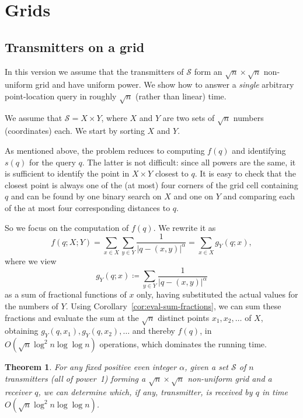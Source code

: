 \documentclass[11pt]{article}
\newtheorem{theorem}{Theorem}[section]
\theoremstyle{remark}
\def\S{\mathcal{S}}
\begin{document}
\iffalse
\section{Grids}
\subsection{Transmitters on a grid}
\label{sec:trans-grid}



In this version we assume that the transmitters of $\S$ form an $\sqrt{n} \times \sqrt{n}$
non-uniform grid and have uniform power.  We show how to answer a \emph{single}
arbitrary point-location query in roughly $\sqrt{n}$ (rather than linear)
time.

We assume that $\S=X \times Y$, where $X$ and $Y$ are two sets of $\sqrt{n}$
numbers (coordinates) each.  We start by sorting $X$ and $Y$.  

As mentioned above, the problem reduces to computing $f(q)$ and
identifying~$s(q)$ for the query $q$.  The latter is not
difficult: since all powers are the same, it is
sufficient to identify the point in $X \times Y$ closest to $q$.  It is
easy to check that the closest point is always one of the (at most) four
corners of the grid cell containing $q$ and can be found by one binary search on
$X$ and one on $Y$ and comparing each of the at most four corresponding
distances to $q$. 

So we focus on the computation of $f(q)$.  We rewrite it as
\[
  f(q;X;Y) = \sum_{x\in X} \sum_{y\in Y} {\frac{1}{|q-(x,y)|^\alpha}} = 
  \sum_{x\in X} g_Y (q;x),
\] 
where we view
\[
  g_Y(q;x) \coloneqq \sum_{y\in Y} {\frac{1}{|q-(x,y)|^\alpha}}
\]
as a sum of fractional functions of $x$ only, having substituted the actual
values for the numbers of $Y$.  Using
Corollary~\ref{cor:eval-sum-fractions}, we can sum these fractions and
evaluate the sum at the $\sqrt{n}$ distinct points $x_1, x_2, \dots $ of $X$,
obtaining $g_Y(q,x_1), g_Y(q,x_2), \ldots$ and thereby $f(q)$, in 
$O(\sqrt{n} \log^2 n \log \log n)$ operations, which dominates the running
time.

\begin{theorem}
  \label{th:2d-transmitters-on-grid}
  For any fixed positive even integer $\alpha$, given a set $\S$ of $n$
  transmitters (all of power~1) forming a $\sqrt{n} \times \sqrt{n}$ non-uniform grid and
	a receiver $q$, we can determine
  which, if any, transmitter, is received by $q$ in
  time $O(\sqrt{n} \log^2 n \log \log n)$.
\end{theorem}
\end{document}
